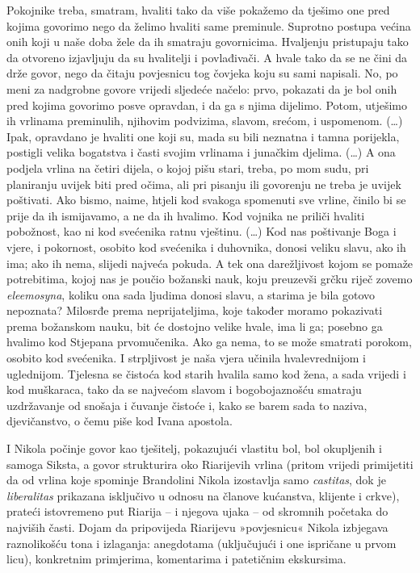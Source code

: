\documentclass[a5paper,twoside]{article}
\renewenvironment{quote}
               {\list{}{\rightmargin 0mm
                \leftmargin 7mm
                \itemindent 0em}%
                \item\relax}
               {\endlist}
\begin{document}
\begin{quote}
Pokojnike treba, smatram, hvaliti tako da više pokažemo da tješimo one pred kojima govorimo nego da želimo hvaliti same preminule. Suprotno postupa većina onih koji u naše doba žele da ih smatraju govornicima. Hvaljenju pristupaju tako da otvoreno izjavljuju da su hvalitelji i povlađivači. A hvale tako da se ne čini da drže govor, nego da čitaju povjesnicu tog čovjeka koju su sami napisali. No, po meni za nadgrobne govore vrijedi sljedeće načelo: prvo, pokazati da je bol onih pred kojima govorimo posve opravdan, i da ga s njima dijelimo. Potom, utješimo ih vrlinama preminulih, njihovim podvizima, slavom, srećom, i uspomenom. (\dots) Ipak, opravdano je hvaliti one koji su, mada su bili neznatna i tamna porijekla, postigli velika bogatstva i časti svojim vrlinama i junačkim djelima. (\dots) A ona podjela vrlina na četiri dijela, o kojoj pišu stari, treba, po mom sudu, pri planiranju uvijek biti pred očima, ali pri pisanju ili govorenju ne treba je uvijek poštivati. Ako bismo, naime, htjeli kod svakoga spomenuti sve vrline, činilo bi se prije da ih ismijavamo, a ne da ih hvalimo. Kod vojnika ne priliči hvaliti pobožnost, kao ni kod svećenika ratnu vještinu. (\dots) Kod nas poštivanje Boga i vjere, i pokornost, osobito kod svećenika i duhovnika, donosi veliku slavu, ako ih ima; ako ih nema, slijedi najveća pokuda. A tek ona darežljivost kojom se pomaže potrebitima, kojoj nas je poučio božanski nauk, koju preuzevši grčku riječ zovemo \textit{eleemosyna}, koliku ona sada ljudima donosi slavu, a starima je bila gotovo nepoznata? Milosrđe prema neprijateljima, koje također moramo pokazivati prema božanskom nauku, bit će dostojno velike hvale, ima li ga; posebno ga hvalimo kod Stjepana prvomučenika. Ako ga nema, to se može smatrati porokom, osobito kod svećenika. I strpljivost je naša vjera učinila hvalevrednijom i uglednijom. Tjelesna se čistoća kod starih hvalila samo kod žena, a sada vrijedi i kod muškaraca, tako da se najvećom slavom i bogobojaznošću smatraju uzdržavanje od snošaja i čuvanje čistoće i, kako se barem sada to naziva, djevičanstvo, o čemu piše kod Ivana apostola.
\end{quote}

I Nikola počinje govor kao tješitelj, pokazujući vlastitu bol, bol okupljenih i samoga Siksta, a govor strukturira oko Riarijevih vrlina (pritom vrijedi primijetiti da od vrlina koje spominje Brandolini Nikola izostavlja samo \textit{castitas}, dok je \textit{liberalitas} prikazana isključivo u odnosu na članove kućanstva, klijente i crkve), prateći istovremeno put Riarija – i njegova ujaka – od skromnih početaka do najviših časti. Dojam da pripovijeda Riarijevu »povjesnicu« Nikola izbjegava raznolikošću tona i izlaganja: anegdotama (uključujući i one ispričane u prvom licu), konkretnim primjerima, komentarima i patetičnim ekskursima. 
\end{document}
